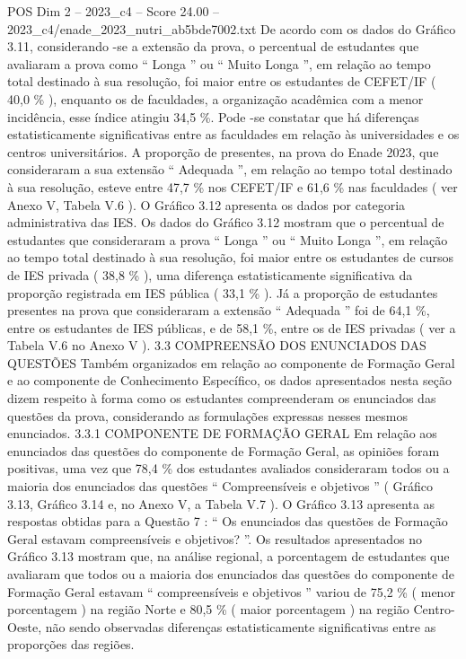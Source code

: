 \begin{textsample}{POS Dim 2 – 2023\_c4 – Score 24.00 – 2023\_c4/enade\_2023\_nutri\_ab5bde7002.txt}
De acordo com os dados do Gráfico 3.11, considerando -se a extensão da prova, o percentual de estudantes que avaliaram a prova como “ Longa ” ou “ Muito Longa ”, em relação ao tempo total destinado à sua resolução, foi maior entre os estudantes de CEFET/IF ( 40,0 \% ), enquanto os de faculdades, a organização acadêmica com a menor incidência, esse índice atingiu 34,5 \%.
Pode -se constatar que há diferenças estatisticamente significativas entre as faculdades em relação às universidades e os centros universitários.
A proporção de presentes, na prova do Enade 2023, que consideraram a sua extensão “ Adequada ”, em relação ao tempo total destinado à sua resolução, esteve entre 47,7 \% nos CEFET/IF e 61,6 \% nas faculdades ( ver Anexo V, Tabela V.6 ).
O Gráfico 3.12 apresenta os dados por categoria administrativa das IES.
Os dados do Gráfico 3.12 mostram que o percentual de estudantes que consideraram a prova “ Longa ” ou “ Muito Longa ”, em relação ao tempo total destinado à sua resolução, foi maior entre os estudantes de cursos de IES privada ( 38,8 \% ), uma diferença estatisticamente significativa da proporção registrada em IES pública ( 33,1 \% ).
Já a proporção de estudantes presentes na prova que consideraram a extensão “ Adequada ” foi de 64,1 \%, entre os estudantes de IES públicas, e de 58,1 \%, entre os de IES privadas ( ver a Tabela V.6 no Anexo V ). 3.3 COMPREENSÃO DOS ENUNCIADOS DAS QUESTÕES Também organizados em relação ao componente de Formação Geral e ao componente de Conhecimento Específico, os dados apresentados nesta seção dizem respeito à forma como os estudantes compreenderam os enunciados das questões da prova, considerando as formulações expressas nesses mesmos enunciados. 3.3.1 COMPONENTE DE FORMAÇÃO GERAL Em relação aos enunciados das questões do componente de Formação Geral, as opiniões foram positivas, uma vez que 78,4 \% dos estudantes avaliados consideraram todos ou a maioria dos enunciados das questões “ Compreensíveis e objetivos ” ( Gráfico 3.13, Gráfico 3.14 e, no Anexo V, a Tabela V.7 ).
O Gráfico 3.13 apresenta as respostas obtidas para a Questão 7 : “ Os enunciados das questões de Formação Geral estavam compreensíveis e objetivos? ”.
Os resultados apresentados no Gráfico 3.13 mostram que, na análise regional, a porcentagem de estudantes que avaliaram que todos ou a maioria dos enunciados das questões do componente de Formação Geral estavam “ compreensíveis e objetivos ” variou de 75,2 \% ( menor porcentagem ) na região Norte e 80,5 \% ( maior porcentagem ) na região Centro-Oeste, não sendo observadas diferenças estatisticamente significativas entre as proporções das regiões.

\end{textsample}
